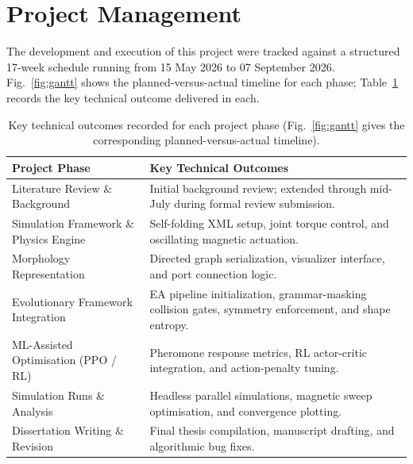 \documentclass[12pt,a4paper]{report}
\begin{document}
\section{Project Management}
The development and execution of this project were tracked against a structured 17-week schedule running from 15 May 2026 to 07 September 2026. Fig.~\ref{fig:gantt} shows the planned-versus-actual timeline for each phase; Table~\ref{tab:project_schedule} records the key technical outcome delivered in each.

\begin{table}[htbp]
\centering
\small
\caption{Key technical outcomes recorded for each project phase (Fig.~\ref{fig:gantt} gives the corresponding planned-versus-actual timeline).}
\label{tab:project_schedule}
\begin{tabular}{p{4.6cm} p{9.2cm}}
\hline
\textbf{Project Phase} & \textbf{Key Technical Outcomes} \\ \hline
Literature Review \& Background & Initial background review; extended through mid-July during formal review submission. \\
Simulation Framework \& Physics Engine & Self-folding XML setup, joint torque control, and oscillating magnetic actuation. \\
Morphology Representation & Directed graph serialization, visualizer interface, and port connection logic. \\
Evolutionary Framework Integration & EA pipeline initialization, grammar-masking collision gates, symmetry enforcement, and shape entropy. \\
ML-Assisted Optimisation (PPO / RL) & Pheromone response metrics, RL actor-critic integration, and action-penalty tuning. \\
Simulation Runs \& Analysis & Headless parallel simulations, magnetic sweep optimisation, and convergence plotting. \\
Dissertation Writing \& Revision & Final thesis compilation, manuscript drafting, and algorithmic bug fixes. \\ \hline
\end{tabular}
\end{table}
\end{document}
